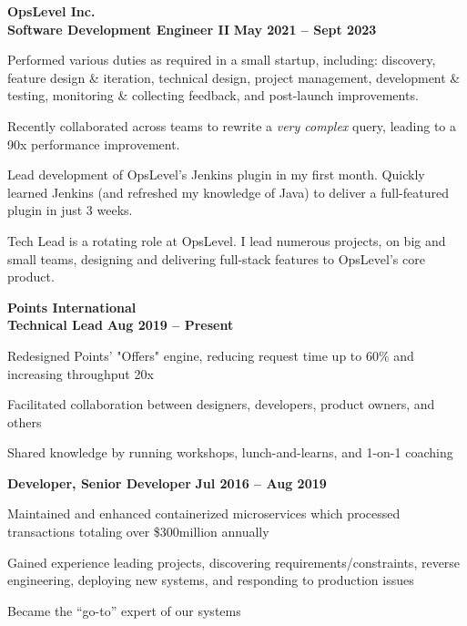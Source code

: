 \documentclass[margin,line]{resume}
\begin{document}
\begin{resume}
    \hspace{-3mm}\textbf{\listing OpsLevel Inc.} \vspace{2mm}\\\vspace{1mm}
    \hspace{1.2mm}\textbf{Software Development Engineer II} \hfill \textbf{May 2021 -- Sept 2023}\vspace{1mm}
    \begin{list2}
        \item Performed various duties as required in a small startup, including: discovery, feature design \& iteration, technical design, project management, development \& testing, monitoring \& collecting feedback, and post-launch improvements.
        \item Recently collaborated across teams to rewrite a \textit{very complex} query, leading to a 90x performance improvement.
        \item Lead development of OpsLevel's Jenkins plugin in my first month. Quickly learned Jenkins (and refreshed my knowledge of Java) to deliver a full-featured plugin in just 3 weeks.
        \item Tech Lead is a rotating role at OpsLevel. I lead numerous projects, on big and small teams, designing and delivering full-stack features to OpsLevel's core product.
    \end{list2}

    \hspace{-3mm}\textbf{\listing Points International} \vspace{2mm}\\\vspace{1mm}
    \hspace{1.2mm}\textbf{Technical Lead} \hfill \textbf{Aug 2019 -- Present}\vspace{1mm}
    \begin{list2}
        \item Redesigned Points’ "Offers" engine, reducing request time up to 60\% and increasing throughput 20x
        \item Facilitated collaboration between designers, developers, product owners, and others
        \item Shared knowledge by running workshops, lunch-and-learns, and 1-on-1 coaching
    \end{list2}

    \hspace{2.6mm}\textbf{Developer, Senior Developer} \hfill \textbf{Jul 2016 -- Aug 2019}\vspace{1mm}
    \begin{list2}
        \item Maintained and enhanced containerized microservices which processed transactions totaling over \$300million annually
        \item Gained experience leading projects, discovering requirements/constraints, reverse engineering, deploying new systems, and responding to production issues
        \item Became the “go-to” expert of our systems
    \end{list2}


\end{resume}
\end{document}
